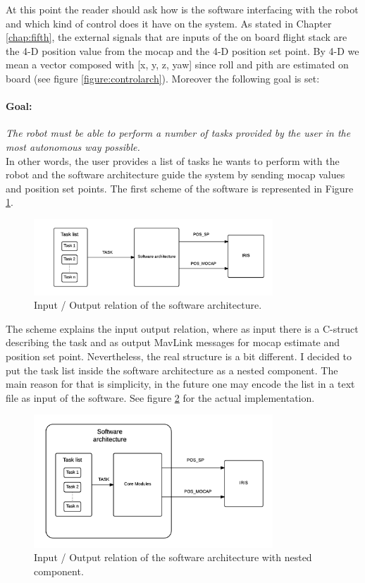 At this point the reader should ask how is the software interfacing with the robot and which kind of control does it have on the system. As stated in Chapter \ref{chap:fifth}, the external signals that are inputs of the on board flight stack are the 4-D position value from the mocap and the 4-D position set point. By 4-D we mean a vector composed with [x, y, z, yaw] since roll and pith are estimated on board (see figure \ref{figure:controlarch}). Moreover the following goal is set:
\paragraph{Goal:} \textit{The robot must be able to perform a number of tasks provided by the user in the most autonomous way possible.} \\

\noindent
In other words, the user provides a list of tasks he wants to perform with the robot and the software architecture guide the system by sending mocap values and position set points. The first scheme of the software is represented in Figure \ref{figure:inout}. 
\begin{figure}[h]
\centering
 \includegraphics[width=0.8\textwidth]{first_arch.png}
 \caption[In-out relation]{Input / Output relation of the software architecture.}
 \label{figure:inout}
\end{figure}
The scheme explains the input output relation, where as input there is a C-struct describing the task and as output MavLink messages for mocap estimate and position set point. Nevertheless, the real structure is a bit different. I decided to put the task list inside the software architecture as a nested component. The main reason for that is simplicity, in the future one may encode the list in a text file as input of the software. See figure \ref{figure:inoutnest} for the actual implementation.

\begin{figure}[h]
\centering
 \includegraphics[width=0.8\textwidth]{nested_arch.png}
 \caption[In-out relation for the nested arch]{Input / Output relation of the software architecture with nested component.}
 \label{figure:inoutnest}
\end{figure}

